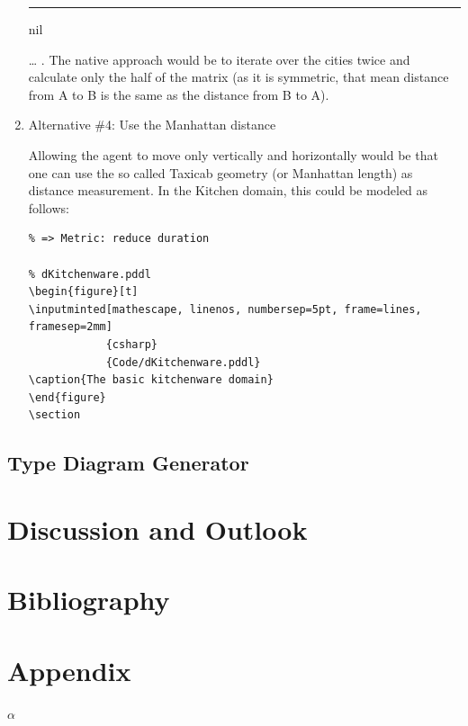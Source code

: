 \documentclass[11pt]{article}
\begin{document}
\begin{enumerate}
\begin{center}
{\begin{minipage}[c]{.6\textwidth}
\rule[.8em]{\textwidth}{2pt}

nil\end{minipage}
}
\end{center}
\ldots{} . The native approach would be to iterate over the cities twice
and calculate only the half of the matrix (as it is symmetric, that
mean distance from A to B is the same as the distance from B to A).

\item Alternative \#4: Use the Manhattan distance
\label{sec-4-4-2-4}

Allowing the agent to move only vertically and horizontally would be
that one can use the so called Taxicab geometry (or Manhattan length)
as distance measurement.  In the Kitchen domain, this could be modeled
as follows:

\begin{verbatim}
% => Metric: reduce duration

% dKitchenware.pddl 
\begin{figure}[t]
\inputminted[mathescape, linenos, numbersep=5pt, frame=lines, framesep=2mm]
            {csharp}
            {Code/dKitchenware.pddl}
\caption{The basic kitchenware domain}
\end{figure}
\section
\end{verbatim}

\begin{center}
\end{center}
\end{enumerate}
\subsection{Type Diagram Generator}
\label{sec-4-5}

\section{Discussion and Outlook}
\label{sec-5}
\section{Bibliography}
\label{sec-6}
\printbibliography

\section{Appendix}
\label{sec-7}
\(\alpha\)
\end{document}

